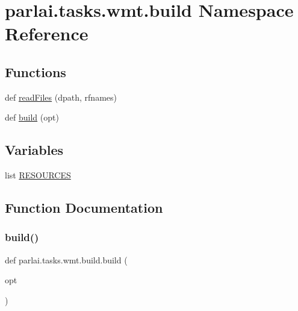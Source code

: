 \hypertarget{namespaceparlai_1_1tasks_1_1wmt_1_1build}{}\section{parlai.\+tasks.\+wmt.\+build Namespace Reference}
\label{namespaceparlai_1_1tasks_1_1wmt_1_1build}
\subsection*{Functions}
\begin{DoxyCompactItemize}
\item 
def \hyperlink{namespaceparlai_1_1tasks_1_1wmt_1_1build_a192eab3c7b1241809a1c134d54a9933f}{read\+Files} (dpath, rfnames)
\item 
def \hyperlink{namespaceparlai_1_1tasks_1_1wmt_1_1build_a824777527357c539f3e9d748efaa2f57}{build} (opt)
\end{DoxyCompactItemize}
\subsection*{Variables}
\begin{DoxyCompactItemize}
\item 
list \hyperlink{namespaceparlai_1_1tasks_1_1wmt_1_1build_a78f0125bdaa0d98648c5eb3f34012dac}{R\+E\+S\+O\+U\+R\+C\+ES}
\end{DoxyCompactItemize}


\subsection{Function Documentation}
\mbox{\label{namespaceparlai_1_1tasks_1_1wmt_1_1build_a824777527357c539f3e9d748efaa2f57}} 
\subsubsection{\texorpdfstring{build()}{build()}}
{\footnotesize\ttfamily def parlai.\+tasks.\+wmt.\+build.\+build (\begin{DoxyParamCaption}\item[{}]{opt }\end{DoxyParamCaption})}

